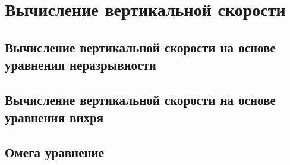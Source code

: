 \chapter{Вычисление вертикальной скорости}
    \lipsum[1-2]

\section{Вычисление вертикальной скорости на основе уравнения неразрывности}
    \lipsum[1-2]

\section{Вычисление вертикальной скорости на основе уравнения вихря}
    \lipsum[1-2]

\section{Омега уравнение}
    \lipsum[1-2]

